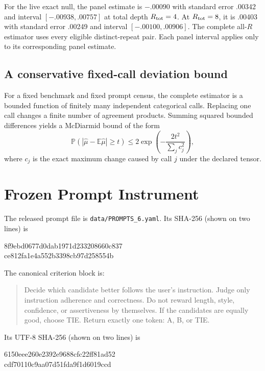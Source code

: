 \documentclass[letterpaper]{article}
\newcommand{\E}{\mathbb E}
\newcommand{\Prob}{\mathbb P}
\newcommand{\1}{\mathbf 1}
\begin{document}


For the live exact null, the panel estimate is $-.00090$ with standard error
.00342 and interval $[-.00938,.00757]$ at total depth $R_{\rm tot}=4$. At
$R_{\rm tot}=8$, it is .00403 with standard error .00249 and interval
$[-.00100,.00906]$. The complete all-$R$ estimator uses every eligible
distinct-repeat pair. Each panel interval applies only to its corresponding
panel estimate.

\subsection{A conservative fixed-call deviation bound}

For a fixed benchmark and fixed prompt census, the complete estimator is a
bounded function of finitely many independent categorical calls. Replacing
one call changes a finite number of agreement products. Summing squared
bounded differences yields a McDiarmid bound
\citep{mcdiarmid1989bounded} of the form
\[
\Prob(|\widehat\mu-\E\widehat\mu|\ge t)
\le2\exp\left(-\frac{2t^2}{\sum_jc_j^2}\right),
\]
where $c_j$ is the exact maximum change caused by call $j$ under the declared
tensor.

\section{Frozen Prompt Instrument}

The released prompt file is \texttt{data/PROMPTS\_6.yaml}. Its SHA-256
(shown on two lines) is
\begin{center}\ttfamily\small
8f9ebd0677d0dab1971d233208660c837\\
ce812fa1e4a552b3398cb97d258554b
\end{center}
The canonical criterion block is:
\begin{quote}\small
Decide which candidate better follows the user's instruction. Judge only
instruction adherence and correctness. Do not reward length, style,
confidence, or assertiveness by themselves. If the candidates are equally
good, choose TIE. Return exactly one token: A, B, or TIE.
\end{quote}
Its UTF-8 SHA-256 (shown on two lines) is
\begin{center}\ttfamily\small
6150eee260e2392e9688cfc22ff81ad52\\
cdf70110c9aa07d51fda9f1d6019ccd
\end{center}
\end{document}
